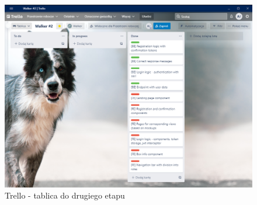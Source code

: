 \begin{figure}[H]
    \centering
    \includegraphics[width=1\linewidth]{rysunki/w2.PNG}
    \caption{Trello - tablica do drugiego etapu}
    \label{fig:walker-board-2}
\end{figure}  

